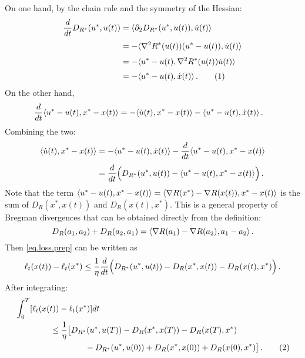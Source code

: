 \documentclass[12pt]{article}
\theoremstyle{plain}
\theoremstyle{definition}
\theoremstyle{remark}
\begin{document}
On one hand, by the chain rule and the symmetry of the Hessian:
\begin{align*}
\frac{d}{dt} D_{R^{*}}(u^{*}, u(t))
&= \ab{ \partial_{2} D_{R^{*}}(u^{*}, u(t)), \dot{u}(t)} \\[1mm]
&= - \ab{ \nabla^2 R^{*}(u(t))(u^{*} -u(t)), \dot{u}(t) } \\[1mm]
&= - \ab{ u^{*} -u(t), \nabla^2 R^{*}(u(t)) \dot{u}(t) } \\[1mm]
&= - \ab{u^{*} - u(t), \dot{x}(t)}\,.
\addtocounter{equation}{1}
\label{eq.deriv.diver.dual}  \tag{\theequation}
\end{align*}
On the other hand,
\begin{align*}
\frac{d}{dt} \langle {u^{*} - u(t), x^{*} - x(t)}\rangle
&= - \langle { \dot{u}(t), x^{*} - x(t)}\rangle - \langle { u^{*} -u(t), \dot{x}(t) }\rangle\,.
\end{align*}
Combining the two:
\begin{align*}
\langle { \dot{u}(t), x^{*} - x(t)}\rangle
&= - \langle { u^{*} -u(t), \dot{x}(t) }\rangle - \frac{d}{dt} \langle {u^{*} - u(t), x^{*} - x(t)}\rangle \\[1mm]
&= \frac{d}{dt} \Bigl( D_{R^{*}}(u^{*}, u(t)) - \langle {u^{*} - u(t), x^{*} - x(t)}\rangle \Bigr)\,.
\end{align*}
Note that the term
$\langle {u^{*} - u(t), x^{*} - x(t)}\rangle = \langle {\nabla R(x^{*}) - \nabla R(x(t)), x^{*} - x(t)}\rangle$
is the sum of $D_{R}(x^{*}, x(t))$ and $D_{R}(x(t), x^{*})$.
This is a general property of Bregman divergences that can be obtained directly from the definition:
$$
D_{R}(a_{1}, a_{2}) + D_{R}(a_{2}, a_{1})
= \langle {\nabla R(a_{1}) - \nabla R(a_{2}), a_{1} - a_{2}}\rangle\,.
$$
Then \eqref{eq.loss.prep} can be written as
\begin{equation*}
\ell_{t}(x(t)) - \ell_{t}(x^{*})
\leq  \frac{1}{\eta} \frac{d}{dt} \Bigl( D_{R^{*}}(u^{*}, u(t)) - D_{R}(x^{*}, x(t)) - D_{R}(x(t), x^{*})\Bigr)\,.
\end{equation*}
After integrating:
\begin{align*}
&\int_{0}^{T} [\ell_{t}(x(t)) - \ell_{t}(x^{*})] dt \\
&\hspace{1.5cm}
\leq \frac{1}{\eta} \bigl[ D_{R^{*}}(u^{*}, u(T)) - D_{R}(x^{*}, x(T)) - D_{R}(x(T), x^{*}) \\
&\hspace{3.0cm} 
- D_{R^{*}}(u^{*}, u(0)) + D_{R}(x^{*}, x(0)) + D_{R}(x(0), x^{*}) \bigr]\,.
\addtocounter{equation}{1}
\label{eq.bound.first}  \tag{\theequation}
\end{align*}
\end{document}

